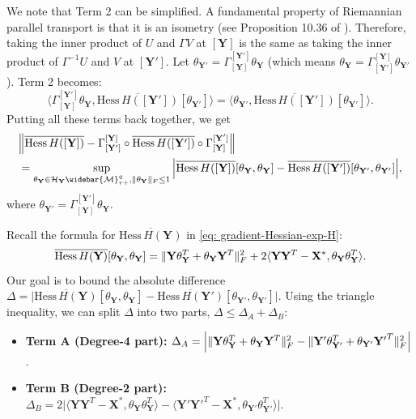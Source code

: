 \documentclass[11pt]{article}
\newcommand{\cH}{\mathcal{H}}
\newcommand{\0}{{\mathbf{0}}}
\newcommand{\1}{{\mathbf{1}}}
\newcommand{\X}{{\mathbf{X}}}
\newcommand{\Y}{{\mathbf{Y}}}
\newcommand{\cM}{{\cal M}}
\newcommand{\F}{{\rm F}}
\begin{document}
{We note that {Term 2} can be simplified. A fundamental property of Riemannian parallel transport is that it is an {isometry} (see Proposition 10.36 of \cite{boumal2020introduction}). Therefore, taking the inner product of $U$ and $\Gamma V$ at $[\mathbf{Y}]$ is the same as taking the inner product of $\Gamma^{-1} U$ and $V$ at $[\mathbf{Y'}]$. Let $\theta_{\mathbf{Y'}} = \Gamma_{[\mathbf{Y}]}^{[\mathbf{Y'}]} \theta_{\mathbf{Y}}$ (which means $\theta_{\mathbf{Y}} = \Gamma_{[\mathbf{Y'}]}^{[\mathbf{Y}]} \theta_{\mathbf{Y'}}$). Term 2 becomes:
    \[
    \Big\langle \Gamma_{[\mathbf{Y}]}^{[\mathbf{Y'}]} \theta_{\mathbf{Y}}, \overline{\text{Hess}\, H([\mathbf{Y'}])}[\theta_{\mathbf{Y'}}] \Big\rangle = \langle \theta_{\mathbf{Y'}}, \overline{\text{Hess}\, H([\mathbf{Y'}])}[\theta_{\mathbf{Y'}}] \rangle.
    \]
Putting all these terms back together, we get
\begin{equation} \label{ineq:Hessian-Lipschiz}
	\begin{split}
	& \Big\| \overline{\text{Hess}\, H([\mathbf{Y}])} - \Gamma_{[\mathbf{Y'}]}^{[\mathbf{Y}]} \circ \overline{\text{Hess}\, H([\mathbf{Y'}])} \circ \Gamma_{[\mathbf{Y}]}^{[\mathbf{Y'}]} \Big\| \\
	&= \sup_{\theta_{\Y} \in   \cH_\Y\widebar{\cM}_{r+}^{q}, \|\theta_{\Y}\|_{\F} \leq 1}\Big| \overline{\text{Hess}\, H([\mathbf{Y}])}[\theta_{\mathbf{Y}}, \theta_{\mathbf{Y}}] - \overline{\text{Hess}\, H([\mathbf{Y'}])}[\theta_{\mathbf{Y'}}, \theta_{\mathbf{Y'}}] \Big|,
\end{split}
\end{equation} where
 $\theta_{\mathbf{Y'}} = \Gamma_{[\mathbf{Y}]}^{[\mathbf{Y'}]} \theta_{\mathbf{Y}}$.

Recall the formula for $\overline{\text{Hess}\, H(\mathbf{Y})}$ in \eqref{eq: gradient-Hessian-exp-H}:
\[
\overline{\text{Hess}\, H(\mathbf{Y})}[\theta_{\mathbf{Y}}, \theta_{\mathbf{Y}}] = \| \mathbf{Y}\theta_{\mathbf{Y}}^T + \theta_{\mathbf{Y}}\mathbf{Y}^T \|_{\F}^2 + 2 \langle \mathbf{Y}\mathbf{Y}^T - \X^*, \theta_{\mathbf{Y}}\theta_{\mathbf{Y}}^T \rangle.
\]
Our goal is to bound the absolute difference $\Delta = \Big|\overline{\text{Hess}\, H(\mathbf{Y})}[\theta_{\mathbf{Y}}, \theta_{\mathbf{Y}}] - \overline{\text{Hess}\, H(\mathbf{Y'})}[\theta_{\mathbf{Y'}}, \theta_{\mathbf{Y'}}] \Big|$.
Using the triangle inequality, we can split $\Delta$ into two parts, $\Delta \le \Delta_A + \Delta_B$:
\begin{itemize}
    \item \textbf{Term A (Degree-4 part):} $\Delta_A = \Big| \| \mathbf{Y}\theta_{\mathbf{Y}}^T + \theta_{\mathbf{Y}} \mathbf{Y}^T \|_{\F}^2 - \| \mathbf{Y'}\theta_{\mathbf{Y'}}^T + \theta_{\mathbf{Y'}} \mathbf{Y'}^T \|_{\F}^2 \Big|$.
    \item \textbf{Term B (Degree-2 part):} $\Delta_B = 2 \Big| \langle \mathbf{Y}\mathbf{Y}^T - \X^*, \theta_{\mathbf{Y}} \theta_{\mathbf{Y}}^T \rangle - \langle \mathbf{Y'}\mathbf{Y'}^T - \X^*, \theta_{\mathbf{Y'}} \theta_{\mathbf{Y'}}^T \rangle \Big|$.
\end{itemize}


}
\end{document}
